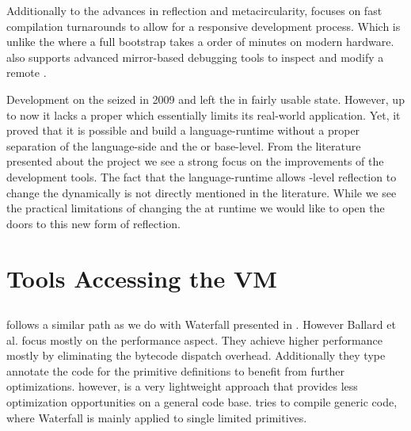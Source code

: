 Additionally to the advances in reflection and metacircularity, \Klein focuses on fast compilation turnarounds to allow for a responsive development process.
Which is unlike the \Squeak \VM where a full \VM bootstrap takes a order of minutes on modern hardware.
\Klein also supports advanced mirror-based debugging tools to inspect and modify a remote \VM.

Development on the \Klein \VM seized in 2009 and left the \Klein \VM in fairly usable state.
However, up to now it lacks a proper \GC which essentially limits its real-world application.
Yet, it proved that it is possible and build a language-runtime without a proper separation of the language-side and the \VM or base-level.
From the literature presented about the \Klein project we see a strong focus on the improvements of the development tools.
The fact that the language-runtime allows \VM-level reflection to change the \VM dynamically is not directly mentioned in the literature.
While we see the practical limitations of changing the \VM at runtime we would like to open the doors to this new form of reflection.


\section{Tools Accessing the VM}

\subsection*{\Quicktalk}
\Quicktalk \cite{Ball86a} follows a similar path as we do with Waterfall presented in .
However Ballard et al. focus mostly on the performance aspect.
They achieve higher performance mostly by eliminating the bytecode dispatch overhead.
Additionally they type annotate the code for the primitive definitions to benefit from further optimizations.
\WF however, is a very lightweight approach that provides less optimization opportunities on a general code base.
\Quicktalk tries to compile generic \ST code, where Waterfall is mainly applied to single limited primitives.


\subsection*{\DTrace}


